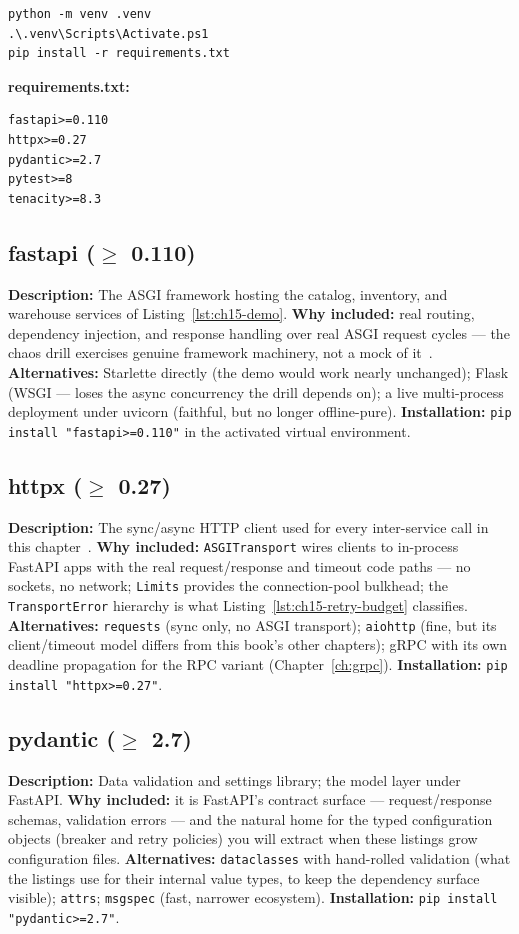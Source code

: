\begin{verbatim}
python -m venv .venv
.\.venv\Scripts\Activate.ps1
pip install -r requirements.txt
\end{verbatim}

\noindent\textbf{requirements.txt:}
\begin{verbatim}
fastapi>=0.110
httpx>=0.27
pydantic>=2.7
pytest>=8
tenacity>=8.3
\end{verbatim}

\subsection{fastapi ($\geq$ 0.110)}
\textbf{Description:} The ASGI framework hosting the catalog, inventory,
and warehouse services of Listing~\ref{lst:ch15-demo}. \textbf{Why
included:} real routing, dependency injection, and response handling over
real ASGI request cycles --- the chaos drill exercises genuine framework
machinery, not a mock of it~\cite{fastapidocs}. \textbf{Alternatives:}
Starlette directly (the demo would work nearly unchanged); Flask (WSGI ---
loses the async concurrency the drill depends on); a live multi-process
deployment under uvicorn (faithful, but no longer offline-pure).
\textbf{Installation:} \texttt{pip install "fastapi>=0.110"} in the
activated virtual environment.

\subsection{httpx ($\geq$ 0.27)}
\textbf{Description:} The sync/async HTTP client used for every
inter-service call in this chapter~\cite{httpxdocs}. \textbf{Why included:}
\texttt{ASGITransport} wires clients to in-process FastAPI apps with the
real request/response and timeout code paths --- no sockets, no network;
\texttt{Limits} provides the connection-pool bulkhead; the
\texttt{TransportError} hierarchy is what
Listing~\ref{lst:ch15-retry-budget} classifies. \textbf{Alternatives:}
\texttt{requests} (sync only, no ASGI transport); \texttt{aiohttp} (fine,
but its client/timeout model differs from this book's other chapters);
gRPC with its own deadline propagation for the RPC variant
(Chapter~\ref{ch:grpc}). \textbf{Installation:}
\texttt{pip install "httpx>=0.27"}.

\subsection{pydantic ($\geq$ 2.7)}
\textbf{Description:} Data validation and settings library; the model layer
under FastAPI. \textbf{Why included:} it is FastAPI's contract surface ---
request/response schemas, validation errors --- and the natural home for
the typed configuration objects (breaker and retry policies) you will
extract when these listings grow configuration files. \textbf{Alternatives:}
\texttt{dataclasses} with hand-rolled validation (what the listings use for
their internal value types, to keep the dependency surface visible);
\texttt{attrs}; \texttt{msgspec} (fast, narrower ecosystem).
\textbf{Installation:} \texttt{pip install "pydantic>=2.7"}.


